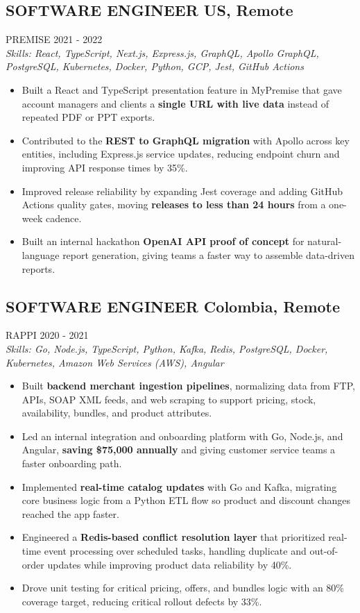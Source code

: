 \documentclass{article}
\newcommand{\WorkExperience}[2]{
   \subsection*{#1}
   \vspace{-1em}
   \uppercase{#2}
}
\newcommand{\Skills}[1]{
   \textit{Skills: #1}
}
\begin{document}
\WorkExperience{SOFTWARE ENGINEER \hfill US, Remote}{Premise \hfill 2021 {-} 2022} \\
\Skills{React, TypeScript, Next.js, Express.js, GraphQL, Apollo GraphQL, PostgreSQL, Kubernetes, Docker, Python, GCP, Jest, GitHub Actions}
\begin{itemize}
\item Built a React and TypeScript presentation feature in MyPremise that gave account managers and clients a \textbf{single URL with live data} instead of repeated PDF or PPT exports.
\item Contributed to the \textbf{REST to GraphQL migration} with Apollo across key entities, including Express.js service updates, reducing endpoint churn and improving API response times by 35\%.
\item Improved release reliability by expanding Jest coverage and adding GitHub Actions quality gates, moving \textbf{releases to less than 24 hours} from a one-week cadence.
\item Built an internal hackathon \textbf{OpenAI API proof of concept} for natural-language report generation, giving teams a faster way to assemble data-driven reports.
\end{itemize}

\WorkExperience{SOFTWARE ENGINEER \hfill Colombia, Remote}{Rappi \hfill 2020 {-} 2021} \\
\Skills{Go, Node.js, TypeScript, Python, Kafka, Redis, PostgreSQL, Docker, Kubernetes, Amazon Web Services (AWS), Angular}
\begin{itemize}
\item Built \textbf{backend merchant ingestion pipelines}, normalizing data from FTP, APIs, SOAP XML feeds, and web scraping to support pricing, stock, availability, bundles, and product attributes.
\item Led an internal integration and onboarding platform with Go, Node.js, and Angular, \textbf{saving \$75,000 annually} and giving customer service teams a faster onboarding path.
\item Implemented \textbf{real-time catalog updates} with Go and Kafka, migrating core business logic from a Python ETL flow so product and discount changes reached the app faster.
\item Engineered a \textbf{Redis-based conflict resolution layer} that prioritized real-time event processing over scheduled tasks, handling duplicate and out-of-order updates while improving product data reliability by 40\%.
\item Drove unit testing for critical pricing, offers, and bundles logic with an 80\% coverage target, reducing critical rollout defects by 33\%.
\end{itemize}
\end{document}
